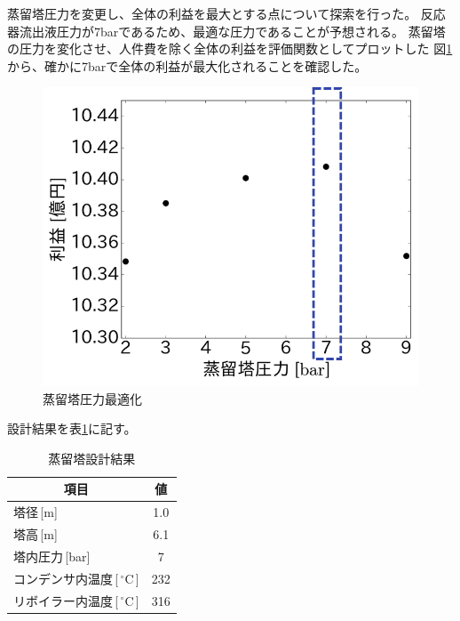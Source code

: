 \documentclass[a4j]{jsreport}
\begin{document}
蒸留塔圧力を変更し、全体の利益を最大とする点について探索を行った。
反応器流出液圧力が7barであるため、最適な圧力であることが予想される。
蒸留塔の圧力を変化させ、人件費を除く全体の利益を評価関数としてプロットした
図\ref{蒸留塔圧力最適化}から、確かに7barで全体の利益が最大化されることを確認した。
\begin{figure}[h]
    \label{蒸留塔圧力最適化}
    \begin{center}
        \includegraphics[scale=0.7]{DistillationPressue.png}
        \caption{蒸留塔圧力最適化}
    \end{center}
\end{figure}

設計結果を表\ref{蒸留塔設計結果}に記す。
\begin{table}[h]
    \label{蒸留塔設計結果}
    \caption{蒸留塔設計結果}
    \begin{center}
        \begin{tabular}{lc}\hline
            \multicolumn{1}{c}{項目}       &  値    \\   \hline
            塔径\,[m]                      &1.0    \\
            塔高\,[m]                      &6.1    \\
            塔内圧力\,[bar]                &7   \\
            コンデンサ内温度\,[\,$^\circ$C\,]       &232     \\
            リボイラー内温度\,[\,$^\circ$C\,]       &316    \\\hline
        \end{tabular}
    \end{center}
\end{table}
\end{document}
